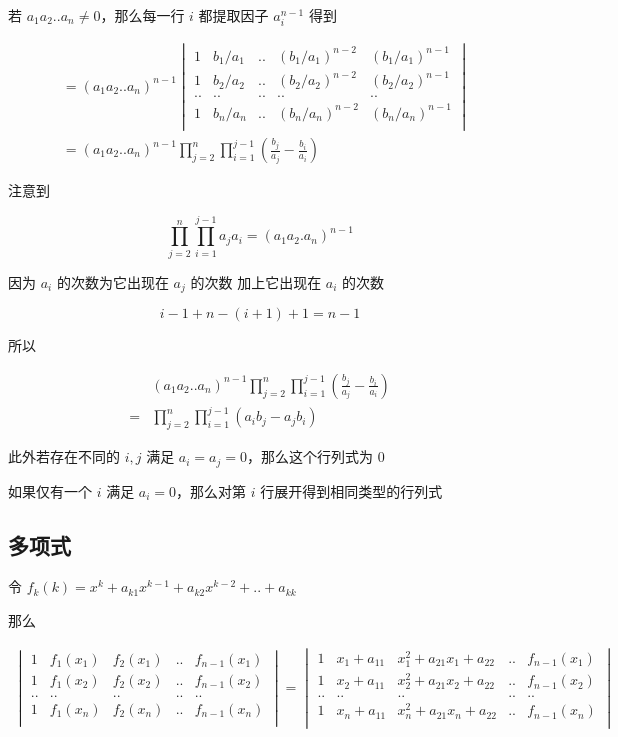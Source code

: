 \documentclass[12pt,a4paper]{ctexart}
\begin{document}
若 $a_1a_2..a_n \ne 0$，那么每一行 $i$ 都提取因子 $a_i^{n-1}$ 得到

\begin{align*}
    & = (a_1a_2..a_n)^{n-1}\begin{vmatrix}
        1 & b_1/a_1 & .. & (b_1/a_1)^{n-2} & (b_1/a_1)^{n-1} \\
        1 & b_2/a_2 & .. & (b_2/a_2)^{n-2} & (b_2/a_2)^{n-1} \\
        .. & .. &.. &.. &..  \\ 
        1 & b_n/a_n & .. & (b_n/a_n)^{n-2} & (b_n/a_n)^{n-1} \\
    \end{vmatrix} \\
    &= (a_1a_2..a_n)^{n-1} \prod_{j=2}^{n}\prod_{i=1}^{j-1}(\frac{b_j}{a_j} - \frac{b_i}{a_i})
\end{align*}

注意到

\[
\prod_{j=2}^{n}\prod_{i=1}^{j-1}a_ja_i = (a_1a_2.a_n)^{n-1}
\]

因为 $a_i$ 的次数为它出现在 $a_j$ 的次数 加上它出现在 $a_i$ 的次数

\[
i-1 + n-(i+1) + 1 = n-1
\]

所以

\begin{align*}
& (a_1a_2..a_n)^{n-1} \prod_{j=2}^{n}\prod_{i=1}^{j-1}(\frac{b_j}{a_j} - \frac{b_i}{a_i})  \\
= & \prod_{j=2}^{n}\prod_{i=1}^{j-1}(a_ib_j - a_jb_i) 
\end{align*}

此外若存在不同的 $i,j$  满足 $a_i = a_j = 0$，那么这个行列式为 0

如果仅有一个 $i$ 满足 $a_i = 0$，那么对第 $i$ 行展开得到相同类型的行列式

\subsection{多项式}

令 $f_k(k) = x^k + a_{k1}x^{k-1} + a_{k2}x^{k-2} + .. + a_{kk} $

那么

\begin{align*}
    \begin{vmatrix}
        1 & f_1(x_1) & f_2(x_1) & .. & f_{n-1}(x_1) \\
        1 & f_1(x_2) & f_2(x_2) & .. & f_{n-1}(x_2) \\
        .. & .. &.. &.. &..  \\
        1 & f_1(x_n) & f_2(x_n) & .. & f_{n-1}(x_n) \\
    \end{vmatrix} =     \begin{vmatrix}
        1 & x_1 + a_{11} & x_1^2 + a_{21}x_1 + a_{22} & .. & f_{n-1}(x_1) \\
        1 & x_2 + a_{11} & x_2^2 + a_{21}x_2 + a_{22} & .. & f_{n-1}(x_2) \\
        .. & .. &.. &.. &..  \\
        1 & x_n + a_{11} & x_n^2 + a_{21}x_n + a_{22} & .. & f_{n-1}(x_n) \\
    \end{vmatrix}
\end{align*}
\end{document}

